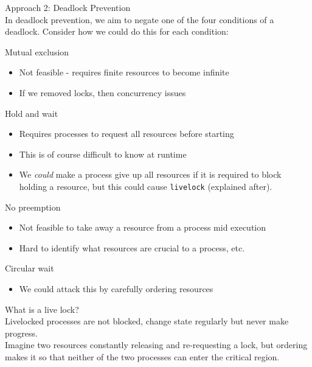 \documentclass[journal, letterpaper]{IEEEtran}
\begin{document}
\begin{theory}{Approach 2: Deadlock Prevention} \\
    In deadlock prevention, we aim to negate one of the four conditions of a deadlock. Consider how we could do this for each condition:
    \begin{aside}{Mutual exclusion}
        \begin{itemize}
            \item Not feasible - requires finite resources to become infinite
            \item If we removed locks, then concurrency issues
        \end{itemize}
    \end{aside}
    \begin{aside}{Hold and wait}
        \begin{itemize}
            \item Requires processes to request all resources before starting
            \item This is of course difficult to know at runtime
            \item We \textit{could} make a process give up all resources if it is required to block holding a resource, but this could cause \verb|livelock| (explained after).
        \end{itemize}
    \end{aside}
    \begin{aside}{No preemption}
        \begin{itemize}
            \item Not feasible to take away a resource from a process mid execution
            \item Hard to identify what resources are crucial to a process, etc.
        \end{itemize}
    \end{aside}
    \begin{aside}{Circular wait}
        \begin{itemize}
            \item We could attack this by carefully ordering resources
        \end{itemize}
    \end{aside}
\end{theory}
\begin{aside}{What is a live lock?} \\
    Livelocked processes are not blocked, change state regularly but never make progress.
    \newline \\
    Imagine two resources constantly releasing and re-requesting a lock, but ordering makes it so that neither of the two processes can enter the critical region.
\end{aside}
\end{document}
